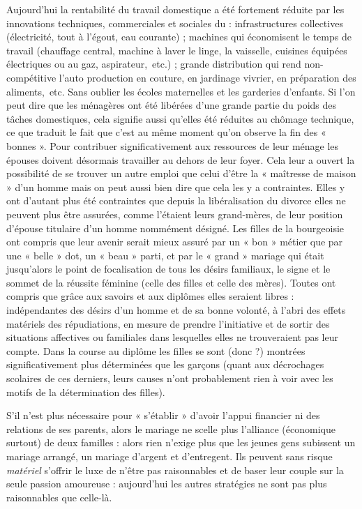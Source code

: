  Aujourd'hui la rentabilité du travail domestique a été fortement réduite par les innovations techniques, commerciales et sociales du  : infrastructures collectives (électricité, tout à l'égout, eau courante) ; machines qui économisent le temps de travail (chauffage central, machine à laver le linge, la vaisselle, cuisines équipées électriques ou au gaz, aspirateur,~etc.) ; grande distribution qui rend non-compétitive l'auto production en couture, en jardinage vivrier, en préparation des aliments,~etc. Sans oublier les écoles maternelles et les garderies d'enfants. Si l'on peut dire que les ménagères ont été libérées d'une grande partie du poids des tâches domestiques, cela signifie aussi qu'elles été réduites au chômage technique, ce que traduit le fait que c'est au même moment qu'on observe la fin des « bonnes ». Pour contribuer significativement aux ressources de leur ménage les épouses doivent désormais travailler au dehors de leur foyer. Cela leur a ouvert la possibilité de se trouver un autre emploi que celui d'être la « maîtresse de maison » d'un homme mais on peut aussi bien dire que cela les  y a contraintes. 
 Elles y ont d'autant plus été contraintes que depuis la libéralisation du divorce elles ne peuvent plus être assurées, comme l'étaient leurs grand-mères, de leur position d'épouse titulaire d'un homme nommément désigné. Les filles de la bourgeoisie ont compris que leur avenir serait mieux assuré par un « bon » métier que par une « belle » dot, un « beau » parti, et par le « grand » mariage qui était jusqu'alors le point de focalisation de tous les désirs familiaux, le signe et le sommet de la réussite féminine (celle des filles et celle des mères). Toutes ont compris que grâce aux savoirs et aux diplômes elles seraient libres : indépendantes des désirs d'un homme et de sa bonne volonté, à l'abri des effets matériels des répudiations, en mesure de prendre l'initiative et de sortir des situations affectives ou familiales dans lesquelles elles ne trouveraient pas leur compte. Dans la course au diplôme les filles se sont (donc ?) montrées significativement plus déterminées que les garçons (quant aux décrochages scolaires de ces derniers, leurs causes n'ont probablement rien à voir avec les motifs de la détermination des filles). 

 S'il n'est plus nécessaire pour « s'établir » d'avoir l'appui financier ni des relations de ses parents, alors le mariage ne scelle plus l'alliance (économique surtout) de deux familles : alors rien n'exige plus que les jeunes gens subissent un mariage arrangé, un mariage d'argent et d'entregent. Ils peuvent sans risque \emph{matériel} s'offrir le luxe de n'être pas raisonnables et de baser leur couple sur la seule passion amoureuse : aujourd'hui les autres stratégies ne sont pas plus raisonnables que celle-là.

